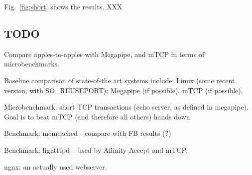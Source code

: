 Fig.~\ref{fig:short} shows the results. XXX


\subsection{TODO}

\todo Compare apples-to-apples with Megapipe, and mTCP in terms of microbenchmarks.

\todo Baseline comparison of state-of-the art systems include:  Linux (some recent version, with SO\_REUSEPORT); Megapipe (if possible), mTCP (if possible). 

\todo Microbenchmark: short TCP transactions (echo server, as defined in megapipe).   Goal is to beat mTCP (and therefore all others) hands down.

\todo Benchmark: memcached - compare with FB results (?)

\todo Benchmark: lightttpd -- used by Affinity-Accept and mTCP.  

\todo ngnx: an actually used webserver.

